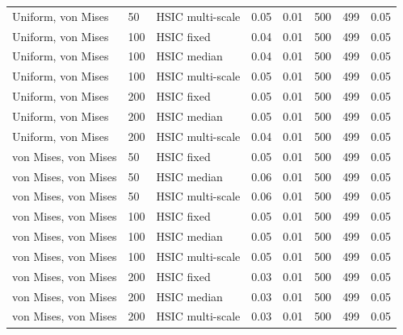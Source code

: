 \begin{table}[!htbp]
\begin{tabular}{llllllll}
Uniform, von Mises &  50 & HSIC multi-scale & 0.05 & 0.01 & 500 & 499 & 0.05\\
Uniform, von Mises & 100 & HSIC fixed & 0.04 & 0.01 & 500 & 499 & 0.05\\
Uniform, von Mises & 100 & HSIC median & 0.04 & 0.01 & 500 & 499 & 0.05\\
Uniform, von Mises & 100 & HSIC multi-scale & 0.05 & 0.01 & 500 & 499 & 0.05\\
Uniform, von Mises & 200 & HSIC fixed & 0.05 & 0.01 & 500 & 499 & 0.05\\
Uniform, von Mises & 200 & HSIC median & 0.05 & 0.01 & 500 & 499 & 0.05\\
Uniform, von Mises & 200 & HSIC multi-scale & 0.04 & 0.01 & 500 & 499 & 0.05\\
von Mises, von Mises &  50 & HSIC fixed & 0.05 & 0.01 & 500 & 499 & 0.05\\
von Mises, von Mises &  50 & HSIC median & 0.06 & 0.01 & 500 & 499 & 0.05\\
von Mises, von Mises &  50 & HSIC multi-scale & 0.06 & 0.01 & 500 & 499 & 0.05\\
von Mises, von Mises & 100 & HSIC fixed & 0.05 & 0.01 & 500 & 499 & 0.05\\
von Mises, von Mises & 100 & HSIC median & 0.05 & 0.01 & 500 & 499 & 0.05\\
von Mises, von Mises & 100 & HSIC multi-scale & 0.05 & 0.01 & 500 & 499 & 0.05\\
von Mises, von Mises & 200 & HSIC fixed & 0.03 & 0.01 & 500 & 499 & 0.05\\
von Mises, von Mises & 200 & HSIC median & 0.03 & 0.01 & 500 & 499 & 0.05\\
von Mises, von Mises & 200 & HSIC multi-scale & 0.03 & 0.01 & 500 & 499 & 0.05\\
\bottomrule
\end{tabular}
\end{table}

